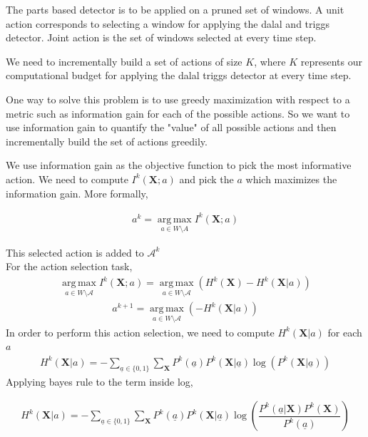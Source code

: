 \documentclass[10pt,twocolumn,letterpaper]{article}
\begin{document}
The parts based detector is to be applied on a pruned set of windows. A unit action corresponds to selecting a window for applying the dalal and triggs detector. Joint action is the set of windows selected at every time step. 

We need to incrementally build a set of actions of size $ K $, where $ K $ represents our computational budget for applying the dalal triggs detector at every time step. 

One way to solve this problem is to use greedy maximization with respect to a metric such as information gain for each of the possible actions. So we want to use information gain to quantify the "value" of all possible actions and then incrementally build the set of actions greedily.
  
We use information gain as the objective function to pick the most informative action.
We need to compute $I^{k}(\textbf{X};a)$ and pick the $a$ which maximizes the information gain. More formally,

\begin{align}
a^{k} = \operatorname*{arg\,max}_{a\in W \setminus A} I^{k}(\textbf{X};a)
\end{align}

This selected action is added to $\mathcal{A}^{k}$\\
For the action selection task,
\begin{align}
\operatorname*{arg\,max}_{a\in W \setminus{\mathcal{A}}}I^{k}(\textbf{X}; a) =\operatorname*{arg\,max}_{a\in W \setminus{\mathcal{A}}} (H^{k}(\textbf{X}) - H^{k}(\textbf{X}|a))
\end{align}
\begin{align}
a^{k+1} =\operatorname*{arg\,max}_{a\in W \setminus{\mathcal{A}}} (- H^{k}(\textbf{X}|a))
\end{align}
In order to perform this action selection, we need to compute $H^{k}(\textbf{X}|a)$ for each $a$
\begin{align}
H^{k}(\textbf{X}| a) = -\sum_{\underline{a}\in\lbrace 0 ,1 \rbrace} \sum_{\textbf{X}} P^{k}(\underline{a})P^{k}(\textbf{X}| \underline{a}) \log(P^{k}(\textbf{X}| \underline{a}))
\end{align}
Applying bayes rule to the term inside log,

\begin{align}
H^{k}(\textbf{X}| a)= -\sum_{\underline{a}\in\lbrace 0 ,1 \rbrace} \sum_{\textbf{X}} P^{k}( \underline{a})P^{k}(\textbf{X}| \underline{a}) \log(\dfrac{P^{k}( \underline{a}|\textbf{X})P^{k}(\textbf{X})}{P^{k}( \underline{a})})
\end{align}
\end{document}
